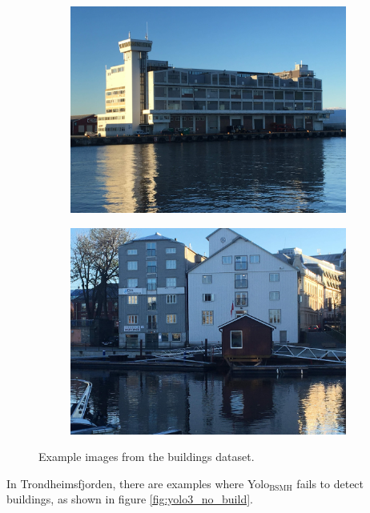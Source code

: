 \begin{figure}[h!]
\begin{subfigure}{.5\textwidth}
  \centering
  \includegraphics[width=0.8\linewidth]{discussion/buildings/IMG_2136.jpg}
\end{subfigure}%
\begin{subfigure}{.5\textwidth}
  \centering
  \includegraphics[width=.8\linewidth]{discussion/buildings/IMG_2085.jpg}
\end{subfigure}
\caption{Example images from the buildings dataset.}
\label{fig:buildings}
\end{figure}

\noindent
In Trondheimsfjorden, there are examples where Yolo$_{\text{BSMH}}$ fails to detect buildings, as shown in figure \ref{fig:yolo3_no_build}.

